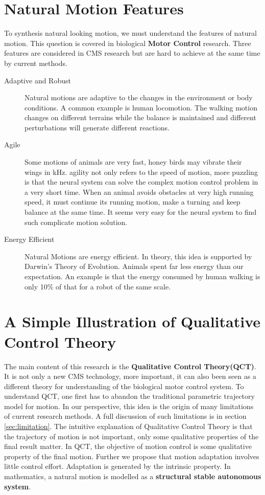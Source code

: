  

\section{Natural Motion Features}
To synthesis natural looking motion, we must understand the features of natural motion.
This question is covered in biological \textbf{Motor Control} research.
Three features are considered in CMS research but are hard to achieve at the same time by current methods. 
\begin{description}
\item [Adaptive and Robust]
Natural motions are adaptive to the changes in the environment or body conditions. 
A common example is human locomotion. 
The walking motion changes on different terrains while the balance is maintained and different perturbations will generate different reactions.  

\item [Agile]
Some motions of animals are very fast, honey birds may vibrate their wings in kHz.
agility not only refers to the speed of motion,
more puzzling is that the neural system can solve the complex motion control problem in a very short time. 
When an animal avoids obstacles at very high running speed, 
it must continue its running motion, make a turning and keep balance at the same time. 
It seems very easy for the neural system to find such complicate motion solution.

\item  [Energy Efficient]
Natural Motions are energy efficient.
In theory, this idea is supported by Darwin's Theory of Evolution.
Animals spent far less energy than our expectation.
An example is that the energy consumed by human walking is only 10\% of that for a robot of the same scale.
\end{description}

\section{A Simple Illustration of Qualitative Control Theory}
The main content of this research is the \textbf{Qualitative Control Theory(QCT)}. 
It is not only a new CMS technology, more important, it can also been seen as a different theory for understanding of the biological motor control system.
To understand QCT, one first has to abandon the traditional parametric trajectory model for motion.
In our perspective, this idea is the origin of many limitations of current research methods.
A full discussion of such limitations is in section \ref{sec:limitation}.
The intuitive explanation of Qualitative Control Theory is that the trajectory of motion is not important, 
only some qualitative properties of the final result matter.
In QCT, the objective of motion control is some qualitative property of the final motion.
Further we propose that motion adaptation involves little  control effort. 
Adaptation is generated by the intrinsic property.
In mathematics, a natural motion is modelled as a \textbf{structural stable autonomous system}.

